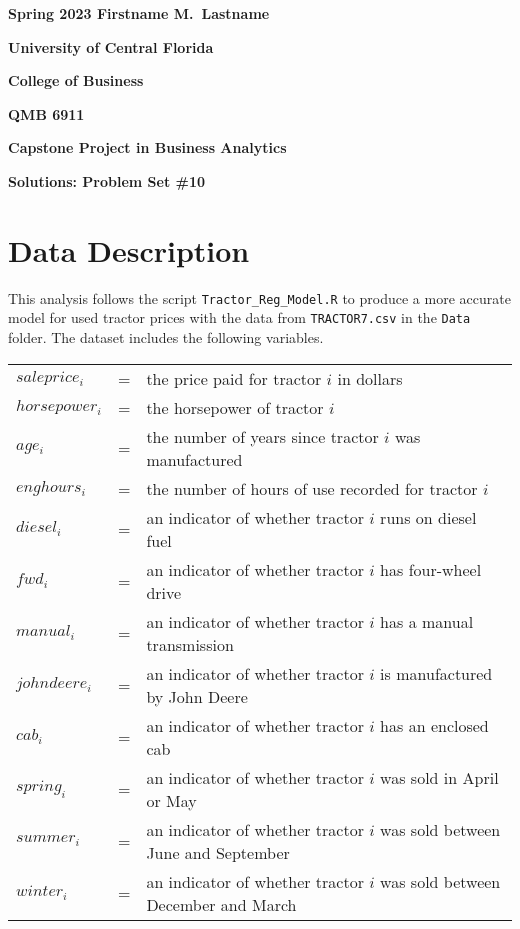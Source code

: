 \documentclass[11pt]{paper}
\begin{document}

\pagestyle{empty}
{\noindent\bf Spring 2023 \hfill Firstname M.~Lastname}
\vskip 16pt
\centerline{\bf University of Central Florida}
\centerline{\bf College of Business}
\vskip 16pt
\centerline{\bf QMB 6911}
\centerline{\bf Capstone Project in Business Analytics}
\vskip 10pt
\centerline{\bf Solutions:  Problem Set \#10}
\vskip 32pt
\noindent
% 
\section{Data Description}

This analysis follows the script \texttt{Tractor\_Reg\_Model.R} to produce a more accurate model for used tractor prices with the data from \texttt{TRACTOR7.csv} in the \texttt{Data} folder. 
The dataset includes the following variables.
\begin{table}[h!]
\begin{tabular}{l l l}

$saleprice_i$ & = & the price paid for tractor $i$ in dollars \\
% 
$horsepower_i$ & = & the horsepower of tractor $i$ \\
$age_i$ & = & the number of years since tractor $i$ was manufactured  \\
$enghours_i$ & = & the number of hours of use recorded for tractor $i$  \\
$diesel_i$ & = & an indicator of whether tractor $i$ runs on diesel fuel \\ %
$fwd_i$ & = & an indicator of whether tractor $i$ has four-wheel drive \\ %
$manual_i$ & = & an indicator of whether tractor $i$ has a manual transmission \\ %
$johndeere_i$ & = & an indicator of whether tractor $i$ is manufactured by John Deere \\ %
$cab_i$ & = & an indicator of whether tractor $i$ has an enclosed cab \\ %
% 
$spring_i$ & = & an indicator of whether tractor $i$ was sold in April or May \\ %
$summer_i$ & = & an indicator of whether tractor $i$ was sold between June and September \\ %
$winter_i$ & = & an indicator of whether tractor $i$ was sold between December and March \\ %

\end{tabular}
\end{table}
%
\end{document}
